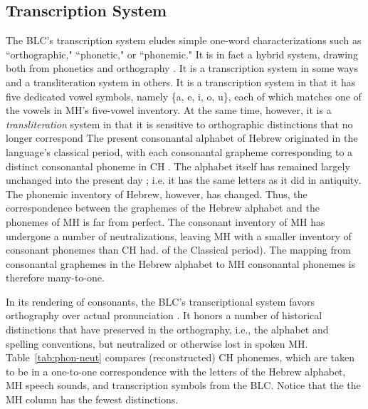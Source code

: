 \subsection{Transcription System}
\label{sec:transcription}
The \ac{BLC}'s transcription system eludes simple one-word 
characterizations such as ``orthographic,"
``phonetic," or ``phonemic." It is in fact a hybrid system, drawing
both from phonetics and orthography \citep{albert-et-al:2013}. 
It is a transcription system in some ways and a transliteration 
system in others. It is a transcription system in that it has 
five dedicated vowel symbols, 
namely \{a, e, i, o, u\}, each of which matches one of the 
vowels in \ac{MH}'s five-vowel inventory. 
At the same time, however, 
it is a \emph{transliteration} system in that it is sensitive to 
orthographic distinctions that no longer correspond
The present consonantal alphabet of Hebrew originated in the 
language's classical period, with each 
consonantal grapheme corresponding to 
a distinct consonantal phoneme in \ac{CH} \citep{rendsburg:1997}. The alphabet itself
has remained largely unchanged 
into the present day \citep{weinberg:1975, ravid:2005}; i.e. it has the same letters as it 
did in antiquity. The phonemic inventory 
of Hebrew, however, has changed. Thus, the correspondence 
between the graphemes of the Hebrew
alphabet and the phonemes of \ac{MH} is far from perfect. 
The consonant inventory of \ac{MH}
has undergone a number of neutralizations, leaving 
\ac{MH} with a smaller inventory of consonant phonemes than
\ac{CH} had. %
of the Classical period). 
The mapping 
from consonantal graphemes in the Hebrew alphabet
to \ac{MH} consonantal phonemes is therefore many-to-one.


In its rendering of consonants, the \ac{BLC}'s transcriptional system 
favors orthography over actual pronunciation \citep{albert-et-al:2013}.
It honors a number of historical distinctions that have preserved in the orthography, 
i.e., the alphabet and 
spelling conventions, but neutralized or otherwise lost in spoken \ac{MH}. 
Table~\ref{tab:phon-neut} compares 
(reconstructed) \ac{CH} phonemes, which are taken to be in a one-to-one 
correspondence with the letters of 
the Hebrew alphabet, \ac{MH} speech sounds, and transcription symbols 
from the \ac{BLC}. Notice that the
the \ac{MH} column has the fewest distinctions.

